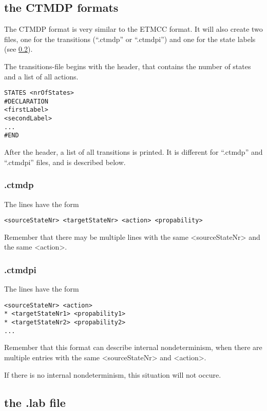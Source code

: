 \documentclass[a4paper,11pt]{scrartcl}
\begin{document}
\subsection{the CTMDP formats}\label{output-ctmdp}

The CTMDP format is very similar to the ETMCC format. It will also create two
files, one for the transitions (``.ctmdp'' or ``.ctmdpi'') and one for the
state labels (see \ref{output-lab}).

The transitions-file begins with the header, that contains the number of states
and a list of all actions.
\begin{verbatim}
STATES <nrOfStates>
#DECLARATION
<firstLabel>
<secondLabel>
...
#END
\end{verbatim}

After the header, a list of all transitions is printed. It is different for ``.ctmdp'' and ``.ctmdpi'' files, and is described below.

\subsubsection{.ctmdp}

The lines have the form
\begin{verbatim}
<sourceStateNr> <targetStateNr> <action> <propability>
\end{verbatim}

Remember that there may be multiple lines with the same <sourceStateNr> and the same <action>.

\subsubsection{.ctmdpi}

The lines have the form
\begin{verbatim}
<sourceStateNr> <action>
* <targetStateNr1> <propability1>
* <targetStateNr2> <propability2>
...
\end{verbatim}

Remember that this format can describe internal nondeterminism, when there are
multiple entries with the same <sourceStateNr> and <action>.

If there is no internal nondeterminism, this situation will not occure.

\subsection{the .lab file}\label{output-lab}
\end{document}
